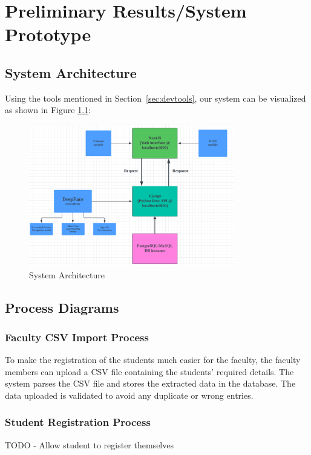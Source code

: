 \chapter{Preliminary Results/System Prototype}

\section{System Architecture}
Using the tools mentioned in Section~\ref{sec:devtools}, our system can be visualized as shown in Figure \ref{fig:architecture}: 
\begin{figure}[h] %
	\centering
	\includegraphics[width=0.8\textwidth]{figures/chapter4/architecture.png} %
	\caption{System Architecture}
	\label{fig:architecture}
\end{figure}
\section{Process Diagrams}

\subsection{Faculty CSV Import Process}
	To make the registration of the students much easier for the faculty, the faculty members can upload a CSV file containing the students' required details. The system parses the CSV file and stores the extracted data in the database. The data uploaded is validated to avoid any duplicate or wrong entries.

\subsection{Student Registration Process}
	TODO - Allow student to register themselves

